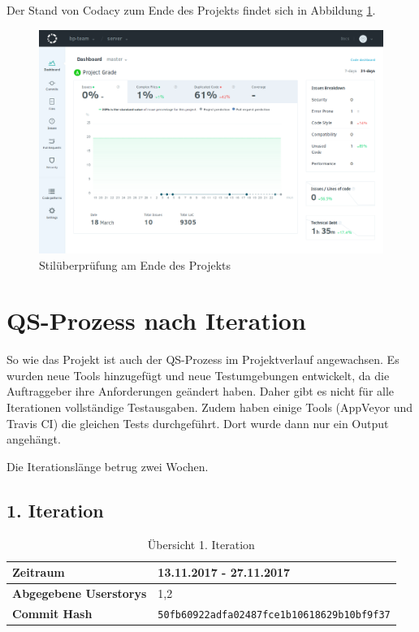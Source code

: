 \documentclass[accentcolor=tud9c,12pt,paper=a4]{tudreport}
\begin{document}
	Der Stand von Codacy zum Ende des Projekts findet sich in Abbildung \ref{codacy_png}.
	\begin{figure}[t]
		\centering
	\includegraphics[width=.9\textwidth]{codacy}
		\caption{Stilüberprüfung am Ende des Projekts}
		\label{codacy_png}
	\end{figure}

	\section{QS-Prozess nach Iteration}
	So wie das Projekt ist auch der QS-Prozess im Projektverlauf angewachsen. Es wurden neue Tools hinzugefügt
	und neue Testumgebungen entwickelt, da die Auftraggeber ihre Anforderungen geändert haben. Daher gibt
	es nicht für alle Iterationen vollständige Testausgaben. Zudem haben einige Tools (AppVeyor und Travis CI)
	die gleichen Tests durchgeführt. Dort wurde dann nur ein Output angehängt.

	Die Iterationslänge betrug zwei Wochen.
	
	\subsection{1. Iteration}
	\begin{table}[H]
	\begin{center}
		\begin{tabular}{| l | l |}
			\hline
			\textbf{Zeitraum} & 13.11.2017 - 27.11.2017\\\hline
			\textbf{Abgegebene Userstorys} & 1,2 \\\hline
			\textbf{Commit Hash} & \texttt{50fb60922adfa02487fce1b10618629b10bf9f37} \\\hline
		\end{tabular}
		\caption{Übersicht 1. Iteration}
	\end{center}
	\end{table}
\end{document}
